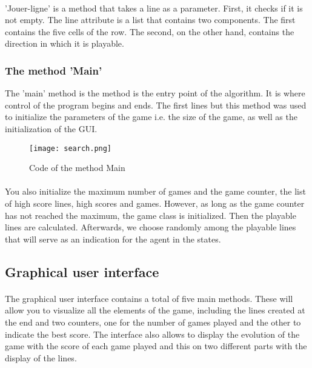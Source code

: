 \documentclass{article}
\begin{document}
\paragraph{}
\setlength{\parindent}{2cm}
'Jouer-ligne' is a method that takes a line as a parameter. First, it checks if it is not empty. The line attribute is a list that contains two components. The first contains the five cells of the row. The second, on the other hand, contains the direction in which it is playable.

\subsubsection{The method 'Main'}
 The 'main' method is the method is the entry point of the algorithm. It is where control of the program begins and ends. The first lines but this method was used to initialize the parameters of the game i.e. the size of the game, as well as the initialization of the GUI. 
\begin{figure}[!h]
\centering
\texttt{[image: search.png]}
\\%
\caption{Code of the method Main}
\end{figure}
 \paragraph{}
\setlength{\parindent}{2cm}
 You also initialize the maximum number of games and the game counter, the list of high score lines, high scores and games. However, as long as the game counter has not reached the maximum, the game class is initialized. Then the playable lines are calculated. Afterwards, we choose randomly among the playable lines that will serve as an indication for the agent in the states. 
\subsection{Graphical user interface}
\paragraph{}
\setlength{\parindent}{2cm}
The graphical user interface contains a total of five main methods. These will allow you to visualize all the elements of the game, including the lines created at the end and two counters, one for the number of games played and the other to indicate the best score. The interface also allows to display the evolution of the game with the score of each game played and this on two different parts with the display of the lines.
\end{document}
